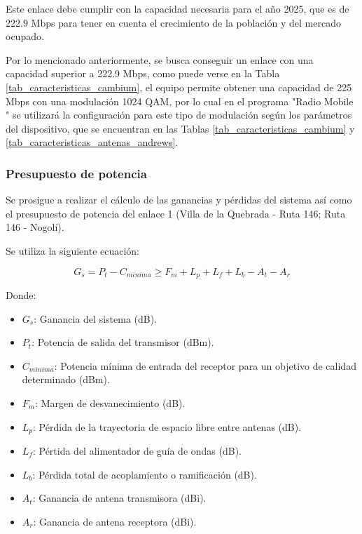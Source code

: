 \documentclass[12pt,a4paper]{book}
\begin{document}
Este enlace debe cumplir con la capacidad necesaria para el año 2025, que es de 222.9 Mbps para tener en cuenta el crecimiento de la población y del mercado ocupado.

Por lo mencionado anteriormente, se busca conseguir un enlace con una capacidad superior a 222.9 Mbps, como puede verse en la Tabla \ref{tab_caracteristicas_cambium}, el equipo permite obtener una capacidad de 225 Mbps con una modulación 1024 QAM, por lo cual en el programa "Radio Mobile " se utilizará la configuración para este tipo de modulación según los parámetros del dispositivo, que se encuentran en las Tablas \ref{tab_caracteristicas_cambium} y \ref{tab_caracteristicas_antenas_andrews}.


\subsubsection{Presupuesto de potencia}

Se prosigue a realizar el cálculo de las ganancias y pérdidas del sistema así como el presupuesto de potencia del enlace 1 (Villa de la Quebrada - Ruta 146; Ruta 146 - Nogolí).

Se utiliza la siguiente ecuación:

\begin{equation}\label{ec_presupuesto_potencia1}
G_{s}=P_{t} - C_{minima} \geq F_{m} + L_{p} + L_{f}+ L_{b} - A_{t} - A_{r}
\end{equation}

Donde:

\begin{itemize}
\item $G_{s}$: Ganancia del sistema (dB).
\item $P_{t}$: Potencia de salida del transmisor (dBm).
\item $C_{minima}$: Potencia mínima de entrada del receptor para un objetivo de calidad determinado (dBm).
\item $F_{m}$: Margen de desvanecimiento (dB).
\item $L_{p}$: Pérdida de la trayectoria de espacio libre entre antenas (dB).
\item $L_{f}$: Pértida del alimentador de guía de ondas (dB).
\item $L_{b}$: Pérdida total de acoplamiento o ramificación (dB).
\item $A_{t}$: Ganancia de antena transmisora (dBi).
\item $A_{r}$: Ganancia de antena receptora (dBi).
\end{itemize}
\end{document}
